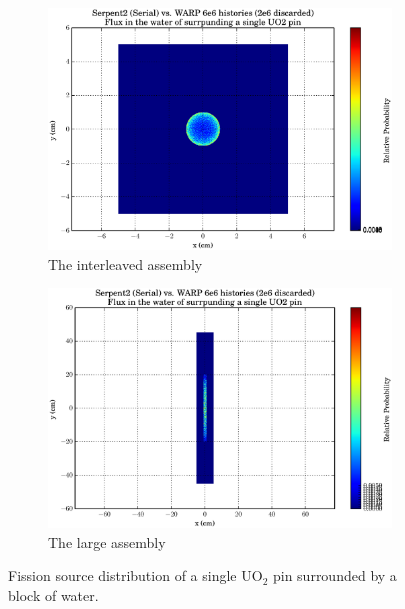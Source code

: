 \begin{figure}[h!]
\centering
\begin{subfigure}{.5\textwidth}
  \centering
  \includegraphics[width=\linewidth]{graphics/finalresults/pincell_fiss1.eps}
  \caption{The interleaved assembly}
  \label{fig:sub1}
\end{subfigure}%
\begin{subfigure}{.5\textwidth}
  \centering
  \includegraphics[width=\linewidth]{graphics/finalresults/pincell_fiss2.eps}
  \caption{The large assembly}
  \label{fig:sub2}
\end{subfigure}
\caption{Fission source distribution of a single UO$_2$ pin surrounded by a block of water. \label{pincell_fiss} }
\end{figure}

